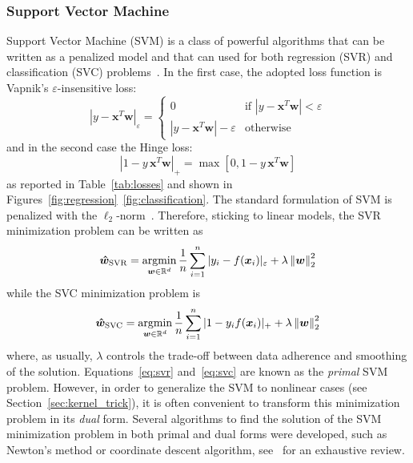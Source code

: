 			\subsubsection{Support Vector Machine}
			Support Vector Machine (\ac{SVM}) is a class of powerful algorithms that can be written as a penalized model and that can used for both regression (\ac{SVR}) and classification (\ac{SVC}) problems~\cite{evgeniou2000regularization}. In the first case, the adopted loss function is Vapnik's $\varepsilon$-insensitive loss:
			\begin{equation} \label{eq:epsilon_insensitive}
				|y - \bm{x}^T\bm{w}|_\varepsilon =
   			\begin{cases}
					0 & \text{if } |y-\bm{x}^T\bm{w}| < \varepsilon\\
					|y-\bm{x}^T\bm{w}| - \varepsilon & \text{otherwise}
				\end{cases}
			\end{equation}
			and in the second case the Hinge loss:
			\begin{equation} \label{eq:hinge_loss}
				|1 - y\,\bm{x}^T\bm{w}|_+ = \max[0, 1 - y\,\bm{x}^T\bm{w}]
			\end{equation}
			as reported in Table~\ref{tab:losses} and shown in Figures~\ref{fig:regression}~\ref{fig:classification}. The standard formulation of SVM is penalized with the $\ell_2$-norm~\cite{vapnik2013nature}.
			Therefore, sticking to linear models, the SVR minimization problem can be written as
			\begin{equation} \label{eq:svr}
				\bm{\hat w}_{\text{SVR}} = \mathop{\mathrm{argmin}}\limits_{\bm{w} \in \mathbb{R}^d} \frac{1}{n} \sum_{i=1}^n |y_i - f(\bm{x}_i)|_\varepsilon + \lambda \left\lVert\bm{w}\right\rVert_2^2
			\end{equation}
			while the SVC minimization problem is
			\begin{equation} \label{eq:svc}
				\bm{\hat w}_{\text{SVC}} = \mathop{\mathrm{argmin}}\limits_{\bm{w} \in \mathbb{R}^d} \frac{1}{n} \sum_{i=1}^n |1 - y_if(\bm{x}_i)|_+ + \lambda \left\lVert\bm{w}\right\rVert_2^2
			\end{equation}
			where, as usually, $\lambda$ controls the trade-off between data adherence and smoothing of the solution.
			Equations~\eqref{eq:svr} and~\eqref{eq:svc} are known as the \textit{primal} SVM problem. However, in order to generalize the SVM to nonlinear cases (see Section~\ref{sec:kernel_trick}), it is often convenient to transform this minimization problem in its \textit{dual} form. Several algorithms to find the solution of the SVM minimization problem in both primal and dual forms were developed, such as Newton's method or coordinate descent algorithm, see~\cite{smola2004tutorial, shawe2011review} for an exhaustive review.

